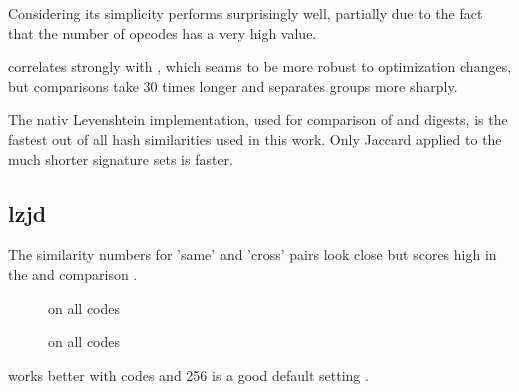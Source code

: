 \documentclass[../main.tex]{subfiles}
\begin{document}
\begin{res}
  Considering its simplicity  performs surprisingly well, partially due to the fact that the number of  opcodes has a very high  value.
\end{res}
\begin{res}
   correlates strongly with , which seams to be more robust to optimization changes, but comparisons take 30 times longer and  separates groups more sharply.
\end{res}
\begin{obs}
  The nativ Levenshtein implementation, used for comparison of  and  digests, is the fastest out of all hash similarities used in this work. Only Jaccard applied to the much shorter  signature sets is faster.
\end{obs}

\subsection{lzjd}

\begin{res}
  The similarity numbers for 'same' and 'cross' pairs look close  but  scores high in the  and  comparison .
\end{res}

\begin{figure}[ht!]
  \centering
  \caption{ on all  \n{\solcts} codes}
  \label{fig:solc_lzjd1}
\end{figure}

\begin{figure}[ht!]
  \centering
  \caption{ on all  \n{\solcts} codes}
  \label{fig:solc_lzjd2}
\end{figure}

\begin{res}
   works better with  codes and 256 is a good default  setting .
\end{res}
\end{document}
